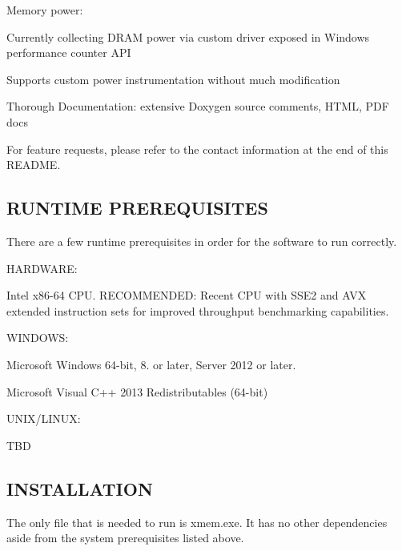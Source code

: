 Memory power\+:
\begin{DoxyItemize}
\item Currently collecting D\+R\+A\+M power via custom driver exposed in Windows performance counter A\+P\+I
\item Supports custom power instrumentation without much modification
\item Thorough Documentation\+: extensive Doxygen source comments, H\+T\+M\+L, P\+D\+F docs
\end{DoxyItemize}

For feature requests, please refer to the contact information at the end of this R\+E\+A\+D\+M\+E. 

 \subsection*{R\+U\+N\+T\+I\+M\+E P\+R\+E\+R\+E\+Q\+U\+I\+S\+I\+T\+E\+S }

There are a few runtime prerequisites in order for the software to run correctly.

H\+A\+R\+D\+W\+A\+R\+E\+:


\begin{DoxyItemize}
\item Intel x86-\/64 C\+P\+U. R\+E\+C\+O\+M\+M\+E\+N\+D\+E\+D\+: Recent C\+P\+U with S\+S\+E2 and A\+V\+X extended instruction sets for improved throughput benchmarking capabilities.
\end{DoxyItemize}

W\+I\+N\+D\+O\+W\+S\+:


\begin{DoxyItemize}
\item Microsoft Windows 64-\/bit, 8. or later, Server 2012 or later.
\item Microsoft Visual C++ 2013 Redistributables (64-\/bit)
\end{DoxyItemize}

U\+N\+I\+X/\+L\+I\+N\+U\+X\+:


\begin{DoxyItemize}
\item T\+B\+D 

 \subsection*{I\+N\+S\+T\+A\+L\+L\+A\+T\+I\+O\+N }
\end{DoxyItemize}

The only file that is needed to run is xmem.\+exe. It has no other dependencies aside from the system prerequisites listed above. 

